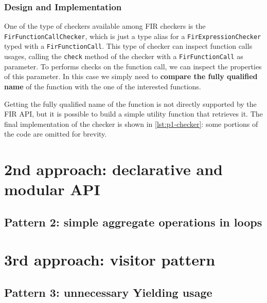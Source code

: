 \documentclass[12pt,a4paper,openright,twoside]{book}
\begin{document}


\subsubsection{Design and Implementation}

One of the type of checkers available among \ac{FIR} checkers is the
\lstinline{FirFunctionCallChecker}, which is just a type alias for a 
\lstinline{FirExpressionChecker} typed with a \lstinline{FirFunctionCall}. 
This type of checker can inspect function calls usages, calling the 
\lstinline{check} method of the checker with a \lstinline{FirFunctionCall}
as parameter. 
%
To performs checks on the function call, we can inspect the properties of this
parameter. In this case we simply need to \textbf{compare the fully qualified
name} of the function with the one of the interested functions.

Getting the fully qualified name of the function is not directly supported by
the \ac{FIR} API, but it is possible to build a simple utility function that
retrieves it. The final implementation of the checker is shown in
\cref{lst:p1-checker}: some portions of the code are omitted for brevity.



\section{2nd approach: declarative and modular API}

\subsection{Pattern 2: simple aggregate operations in loops}

\section{3rd approach: visitor pattern}

\subsection{Pattern 3: unnecessary Yielding usage}
\end{document}
